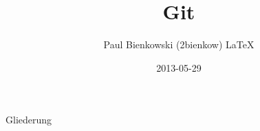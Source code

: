 \documentclass[compress,t,usenames,dvipsnames]{beamer}
\title{Git}
\author{Paul Bienkowski (2bienkow)  \LaTeX}
\institute{KunterBuntesSeminar}
\date{2013-05-29}
\begin{document}
\frame{
    \titlepage
}

\begin{frame}{Gliederung}
    \tableofcontents
\end{frame}






\end{document}
